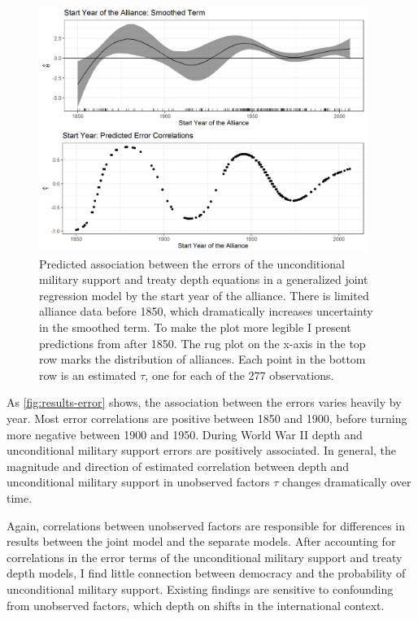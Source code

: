 \documentclass[12pt]{article}
\begin{document}
\begin{figure}[hbtp]
\centering
\includegraphics[width=0.95\textwidth]{../figures/results-error.png}
\caption{Predicted association between the errors of the unconditional military support and treaty depth equations in a generalized joint regression model by the start year of the alliance. There is limited alliance data before 1850, which dramatically increases uncertainty in the smoothed term. To make the plot more legible I present predictions from after 1850. The rug plot on the x-axis in the top row marks the distribution of alliances. Each point in the bottom row is an estimated $\tau$, one for each of the 277 observations.}
\label{fig:results-error}
\end{figure}


As \autoref{fig:results-error} shows, the association between the errors varies heavily by year. 
Most error correlations are positive between 1850 and 1900, before turning more negative between 1900 and 1950. 
During World War II depth and unconditional military support errors are positively associated. 
In general, the magnitude and direction of estimated correlation between depth and unconditional military support in unobserved factors $\tau$ changes dramatically over time.  


Again, correlations between unobserved factors are responsible for differences in results between the joint model and the separate models. 
After accounting for correlations in the error terms of the unconditional military support and treaty depth models, I find little connection between democracy and the probability of unconditional military support. 
Existing findings are sensitive to confounding from unobserved factors, which depth on shifts in the international context. 
\end{document}

